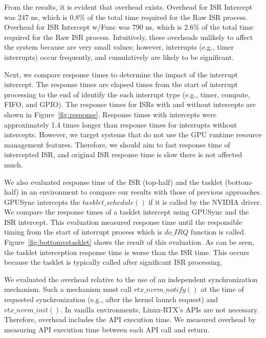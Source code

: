 From the results, it is evident that overhead exists.
Overhead for ISR Intercept was 247 ns, which is 0.8\% of the total time required for the Raw ISR process.
Overhead for ISR Intercept w/Func was 790 ns, which is 2.6\% of the total time required for the Raw ISR process.
Intuitively, these overheads unlikely to affect the system because are very small values;
however, interrupts (e.g., timer interrupts) occur frequently, and cumulatively are likely to be significant.

Next, we compare response times to determine the impact of the interrupt intercept.
The response times are elapsed times from the start of interrupt processing to the end of identify the each interrupt type (e.g., timer, compute, FIFO, and GPIO).
The response times for ISRs with and without intercepts are shown in Figure~\ref{fig:response}.
Response times with intercepts were approximately 1.4 times longer than response times for interrupts without intercepts.
However, we target systems that do not use the GPU runtime resource management features.
Therefore, we should aim to fast response time of intercepted ISR, and original ISR response time is slow there is not affected much.

We also evaluated response time of the ISR (top-half) and the tasklet (bottom-half) in an environment to compare our results with those of previous approaches.
GPUSync intercepts the $tasklet\_schedule()$ if it is called by the NVIDIA driver.
We compare the response times of a tasklet intercept using GPUSync and the ISR intercept.
This evaluation measured response time until the responsible timing from the start of interrupt process which is $do\_IRQ$ function is called.
Figure~\ref{fig:bottomvstasklet} shows the result of this evaluation.
As can be seen, the tasklet interception response time is worse than the ISR time.
This occurs because the tasklet is typically called after significant ISR processing.

We evaluated the overhead relative to the use of an independent synchronization mechanism.
Such a mechanism must call $rtx\_nvrm\_notify()$ at the time of requested synchronization (e.g., after the kernel launch request) and $rtx\_nvrm\_init()$.
In vanilla environments, Linux-RTX’s APIs are not necessary.
Therefore, overhead includes the API execution time.
We measured overhead by measuring API execution time between each API call and return.


